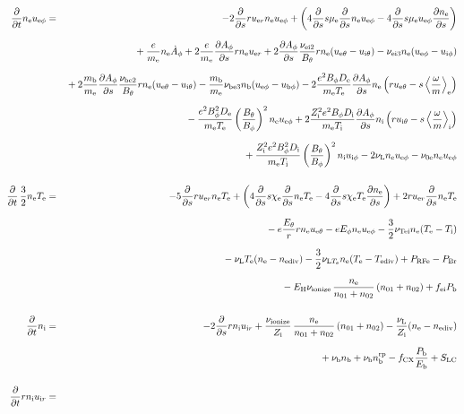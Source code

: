 \documentclass[11pt]{article}
\def\r#1{{\rm#1}}
\def\ddt{\frac{\partial}{\partial t}}
\def\dds{\frac{\partial}{\partial s}}
\def\dd#1{\frac{\partial #1}{\partial s}}
\def\ave#1{\left\langle#1\right\rangle}
\def\me{m_\r{e}}
\def\mb{m_\r{b}}
\def\mue{\mu_\r{e}}
\def\De{D_\r{e}}
\def\Di{D_\r{i}}
\def\chie{\chi_\r{e}}
\def\ne{n_\r{e}}
\def\ni{n_\r{i}}
\def\nb{n_\r{b}}
\def\uer{u_{\r{e}r}}
\def\uir{u_{\r{i}r}}
\def\ueth{u_{\r{e}\theta}}
\def\uith{u_{\r{i}\theta}}
\def\ueph{u_{\r{e}\phi}}
\def\uiph{u_{\r{i}\phi}}
\def\ubph{u_{\r{b}\phi}}
\def\Eth{E_\theta}
\def\Eph{E_\phi}
\def\Bth{B_\theta}
\def\Bph{B_\phi}
\def\Aphd{\dot{A}_\phi}
\def\Aph{A_\phi}
\def\Te{T_\r{e}}
\def\Ti{T_\r{i}}
\def\nna{n_{01}}
\def\nnb{n_{02}}
\def\Zi{Z_\r{i}}
\def\Pb{P_\r{b}}
\def\Eb{E_\r{b}}
\def\PRFe{P_\r{RFe}}
\def\PBr{P_\r{Br}}
\def\EH{E_\r{H}}
\def\fei{f_\r{ei}}
\def\nbrp{n_\r{b}^\r{rp}}
\def\fCX{f_\r{CX}}
\def\nube{\nu_\r{be}}
\def\nune{\nu_\r{0e}}
\def\nuL{\nu_\r{L}}
\def\nuion{\nu_\r{ionize}}
\def\nub{\nu_\r{b}}
\def\nuTei{\nu_\r{Tei}}
\def\vb{v_\r{b}}
\def\nediv{n_\r{ediv}}
\def\Tediv{T_\r{ediv}}
\def\nuLTe{\nu_{\r{L}T_\r{e}}}
\begin{document}
\begin{eqnarray}
%
%
\\[5mm]
%
%
  \ddt \ne \ueph &=&
%
  - 2 \dds r \uer \ne \ueph
%
  + \left(   4 \dds s \mue \dds \ne \ueph
%
           - 4 \dds s \mue \ueph \dd{\ne} \right)
\nonumber\\[2.5mm]&&{}
%
  + \frac{e}{\me} \ne \Aphd
%
  + 2 \frac{e}{\me} \dd{\Aph} r \ne \uer 
%
  + 2 \dd{\Aph} \frac{\nu_\r{ei2}}{\Bth} r \ne (\ueth - \uith)
%
  - \nu_\r{ei3} \ne (\ueph - \uiph)
\nonumber\\[2.5mm]&&{}
%
  + 2 \frac{\mb}{\me} \dd{\Aph} \frac{\nu_\r{be2}}{\Bth} r \ne (\ueth - \uith)
%
  - \frac{\mb}{\me} \nu_\r{be3} \nb (\ueph - \ubph)
%
  - 2\frac{e^2 \Bph \De}{\me\Te}\dd{\Aph}\ne
    \left(r \ueth - s \ave{\frac{\omega}{m}}_\r{e} \right)
\nonumber\\[2.5mm]&&{}
%
  - \frac{e^2 \Bph^2 \De}{\me\Te}\left(\frac{\Bth}{\Bph}\right)^2\ne\ueph
%
   + 2\frac{\Zi^2 e^2 \Bph \Di}{\me\Ti}\dd{\Aph}\ni
    \left(r \uith - s \ave{\frac{\omega}{m}}_\r{i} \right)
\nonumber\\[2.5mm]&&{}
%
   + \frac{\Zi^2 e^2 \Bph^2
   \Di}{\me\Ti}\left(\frac{\Bth}{\Bph}\right)^2\ni\uiph
%
  - 2 \nuL \ne \ueph
%
  - \nune \ne \ueph
%
%
\\[5mm]
%
%
  \ddt \, \frac{3}{2} \ne \Te &=&
%
   - 5 \dds r \uer \ne \Te
%
   + \left(   4 \dds s \chie \dds \ne \Te
%
            - 4 \dds s \chie \Te \dd{\ne} \right)
%
  + 2 r \uer \dds \ne \Te
%
\nonumber\\[2.5mm]&&{}
%
  -  e \frac{\Eth}{r} r \ne \ueth
%
  -  e \Eph \ne \ueph 
%
  - \frac{3}{2} \nuTei \ne (\Te - \Ti)
%
%
\nonumber\\[2.5mm]&&{}
%
  - \nuL \Te (\ne - \nediv)
%
  - \frac{3}{2} \nuLTe \ne (\Te - \Tediv)
%
  + \PRFe
%
  - \PBr
\nonumber\\[2.5mm]&&{}
%
  - \EH \nuion\, \frac{\ne}{\nna+\nnb}\, (\nna+\nnb)
%
  + \fei \Pb
\\[5mm]
%
%
  \ddt \ni &=&
%
  - 2 \dds r \ni \uir
%
  + \frac{\nuion}{\Zi}\, \frac{\ne}{\nna+\nnb}\, (\nna+\nnb)
%
  - \frac{\nuL}{\Zi} (\ne - \nediv) 
\nonumber\\[2.5mm]&&{}
%
  + \nub \nb
%
  + \nub \nbrp
%
  - \fCX \frac{\Pb}{\Eb}
%
  + S_\r{LC}
\\[5mm]
%
%
  \ddt r \ni \uir &=&

\end{eqnarray}
\end{document}
